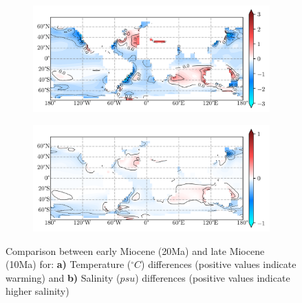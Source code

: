 \documentclass[a4paper]{article}
\begin{document}
\begin{figure}[H]
	\begin{subfigure}[b]{0.5\linewidth}
		\caption{}
		\label{fig:2010cooling}
		\includegraphics[width=\linewidth]{Paleo_eocene_20_10.png}
	\end{subfigure}
	\begin{subfigure}[b]{0.5\linewidth}
		\caption{}
		\label{fig:salt2010cooling}
		\includegraphics[width=\linewidth]{salt_20_10.png}
	\end{subfigure}
	\caption{ Comparison between early Miocene (20Ma) and late Miocene (10Ma) for: \textbf{a)} Temperature ($^{\circ}C$) differences (positive values indicate warming) and  \textbf{b)} Salinity ($psu$) differences (positive values indicate higher salinity)}
\end{figure}
\end{document}
